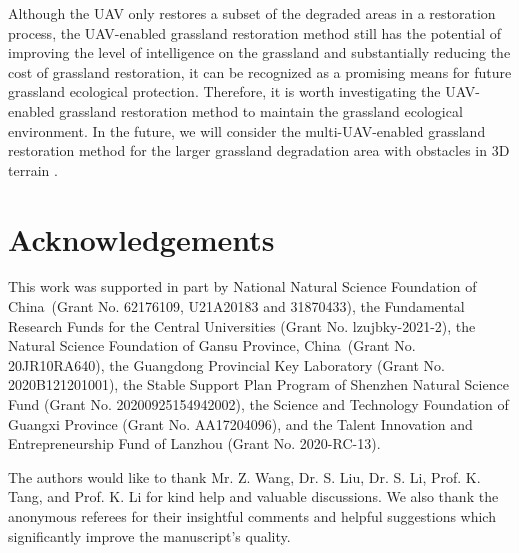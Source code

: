 \documentclass[preprint,5pt]{elsarticle}
\begin{document}
Although the UAV only restores a subset of the degraded areas in a restoration process, the UAV-enabled grassland restoration method still has the potential of improving the level of intelligence on the grassland and substantially reducing the cost of grassland restoration, it can be recognized as a promising means for future grassland ecological protection.
Therefore, it is worth investigating the UAV-enabled grassland restoration method to maintain the grassland ecological environment. In the future, we will consider the multi-UAV-enabled grassland restoration method for the larger grassland degradation area with obstacles in 3D terrain \cite{yang2015path}.
\section*{Acknowledgements}
This work was supported in part by National Natural Science Foundation of China~(Grant No. 62176109, U21A20183 and 31870433), the Fundamental Research Funds for the Central Universities (Grant No. lzujbky-2021-2), the Natural Science Foundation of Gansu Province, China~(Grant No. 20JR10RA640), the Guangdong Provincial Key Laboratory (Grant No. 2020B121201001), the Stable Support Plan Program of Shenzhen Natural Science Fund (Grant No. 20200925154942002), the Science and Technology Foundation of Guangxi Province (Grant No. AA17204096), and the Talent Innovation and Entrepreneurship Fund of Lanzhou (Grant No. 2020-RC-13).

The authors would like to thank Mr. Z. Wang, Dr. S. Liu, Dr. S. Li, Prof. K. Tang, and Prof. K. Li for kind help and valuable discussions. We also thank the anonymous referees for their insightful comments and helpful suggestions which significantly improve the manuscript's quality.
 
 





\end{document}

